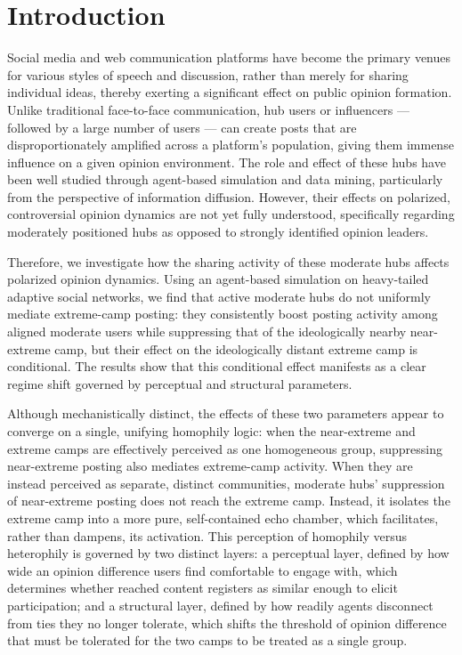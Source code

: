 \documentclass{svproc}
\begin{document}
\section{Introduction}\label{sec:intro}
Social media and web communication platforms have become the primary
venues for various styles of speech and discussion, rather than merely
for sharing individual ideas, thereby exerting a significant effect on
public opinion formation. Unlike traditional face-to-face
communication, hub users or influencers --- followed by a large number
of users --- can create posts that are disproportionately amplified
across a platform's population, giving them immense influence on a
given opinion environment. The role and effect of these hubs have been
well studied through agent-based simulation and data mining,
particularly from the perspective of information diffusion. However,
their effects on polarized, controversial opinion dynamics are not yet
fully understood, specifically regarding moderately positioned hubs as
opposed to strongly identified opinion leaders.
\par


Therefore, we investigate how the sharing activity of these moderate
hubs affects polarized opinion dynamics. Using an agent-based
simulation on heavy-tailed adaptive social networks, we find that
active moderate hubs do not uniformly mediate extreme-camp posting:
they consistently boost posting activity among aligned moderate users
while suppressing that of the ideologically nearby near-extreme camp,
but their effect on the ideologically distant extreme camp is
conditional. The results show that this conditional effect manifests
as a clear regime shift governed by perceptual and structural
parameters.
\par


Although mechanistically distinct, the effects of these two parameters
appear to converge on a single, unifying homophily logic: when the
near-extreme and extreme camps are effectively perceived as one
homogeneous group, suppressing near-extreme posting also mediates
extreme-camp activity. When they are instead perceived as separate,
distinct communities, moderate hubs' suppression of near-extreme
posting does not reach the extreme camp. Instead, it isolates the
extreme camp into a more pure, self-contained echo chamber, which
facilitates, rather than dampens, its activation. This perception of
homophily versus heterophily is governed by two distinct layers: a
perceptual layer, defined by how wide an opinion difference users find
comfortable to engage with, which determines whether reached content
registers as similar enough to elicit participation; and a structural
layer, defined by how readily agents disconnect from ties they no
longer tolerate, which shifts the threshold of opinion difference that
must be tolerated for the two camps to be treated as a single group.
\par
\end{document}
